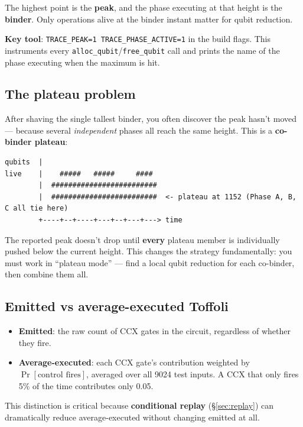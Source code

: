 \documentclass[11pt,a4paper]{article}
\begin{document}
The highest point is the \textbf{peak}, and the phase executing at that height is the
\textbf{binder}. Only operations alive at the binder instant matter for qubit reduction.

\textbf{Key tool}: \texttt{TRACE\_PEAK=1 TRACE\_PHASE\_ACTIVE=1} in the build flags. This
instruments every \texttt{alloc\_qubit}/\texttt{free\_qubit} call and prints the name of the
phase executing when the maximum is hit.

\subsection{The plateau problem}

After shaving the single tallest binder, you often discover the peak hasn't moved --- because
several \emph{independent} phases all reach the same height. This is a \textbf{co-binder plateau}:

\begin{lstlisting}
qubits  |
live    |    #####   #####     ####
        |  #########################
        |  #########################  <- plateau at 1152 (Phase A, B, C all tie here)
        +----+--+----+---+--+---+---> time
\end{lstlisting}

The reported peak doesn't drop until \textbf{every} plateau member is individually pushed below the
current height. This changes the strategy fundamentally: you must work in ``plateau mode'' ---
find a local qubit reduction for each co-binder, then combine them all.

\subsection{Emitted vs average-executed Toffoli}

\begin{itemize}
  \item \textbf{Emitted}: the raw count of CCX gates in the circuit, regardless of whether they fire.
  \item \textbf{Average-executed}: each CCX gate's contribution weighted by $\Pr[\text{control fires}]$,
    averaged over all 9024 test inputs. A CCX that only fires 5\% of the time contributes only 0.05.
\end{itemize}

This distinction is critical because \textbf{conditional replay} (\S\ref{sec:replay}) can
dramatically reduce average-executed without changing emitted at all.
\end{document}
